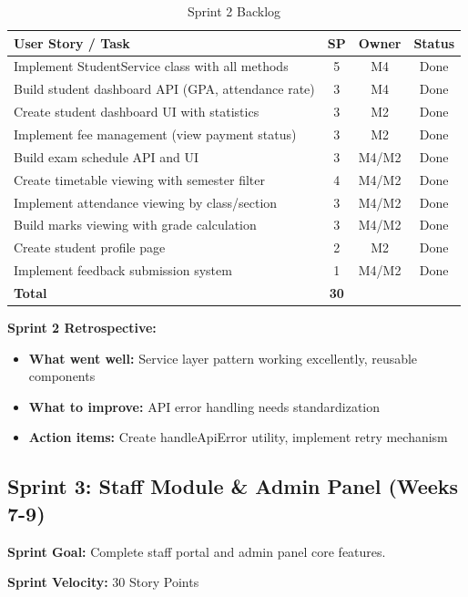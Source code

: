 \documentclass[12pt,a4paper]{article}
\begin{document}
\begin{table}[H]
\centering
\begin{tabularx}{\textwidth}{|X|c|c|c|}
\hline
\textbf{User Story / Task} & \textbf{SP} & \textbf{Owner} & \textbf{Status} \\
\hline
Implement StudentService class with all methods & 5 & M4 & Done \\
\hline
Build student dashboard API (GPA, attendance rate) & 3 & M4 & Done \\
\hline
Create student dashboard UI with statistics & 3 & M2 & Done \\
\hline
Implement fee management (view payment status) & 3 & M2 & Done \\
\hline
Build exam schedule API and UI & 3 & M4/M2 & Done \\
\hline
Create timetable viewing with semester filter & 4 & M4/M2 & Done \\
\hline
Implement attendance viewing by class/section & 3 & M4/M2 & Done \\
\hline
Build marks viewing with grade calculation & 3 & M4/M2 & Done \\
\hline
Create student profile page & 2 & M2 & Done \\
\hline
Implement feedback submission system & 1 & M4/M2 & Done \\
\hline
\textbf{Total} & \textbf{30} & & \\
\hline
\end{tabularx}
\caption{Sprint 2 Backlog}
\end{table}

\textbf{Sprint 2 Retrospective:}
\begin{itemize}[noitemsep]
    \item \textbf{What went well:} Service layer pattern working excellently, reusable components
    \item \textbf{What to improve:} API error handling needs standardization
    \item \textbf{Action items:} Create handleApiError utility, implement retry mechanism
\end{itemize}

\subsection{Sprint 3: Staff Module \& Admin Panel (Weeks 7-9)}

\textbf{Sprint Goal:} Complete staff portal and admin panel core features.

\textbf{Sprint Velocity:} 30 Story Points
\end{document}
